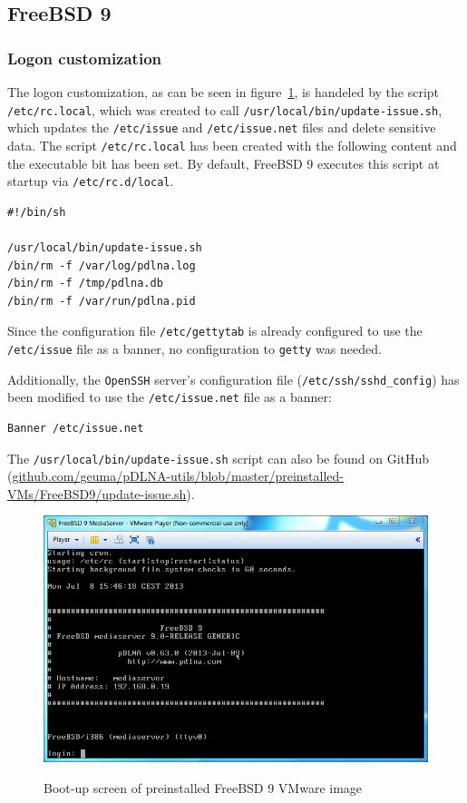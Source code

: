 \documentclass[a4paper,oneside,10pt]{report}
\newenvironment{colframefile}{%
  \begin{Sbox}
    \begin{minipage}{.99\columnwidth}
}{%
  \end{minipage}
  \end{Sbox}
  \begin{center}
    \fcolorbox{black}{Yellow}{\TheSbox}
  \end{center}
}
\begin{document}
\subsection{FreeBSD 9}

\subsubsection{Logon customization}

The logon customization, as can be seen in figure~\ref{fig:freebsd9-loginscreen}, is handeled by the script \verb|/etc/rc.local|, which was created to call \verb|/usr/local/bin/update-issue.sh|, which updates the \verb|/etc/issue| and \verb|/etc/issue.net| files and delete sensitive data. The script \verb|/etc/rc.local| has been created with the following content and the executable bit has been set. By default, FreeBSD 9 executes this script at startup via \verb|/etc/rc.d/local|.
\begin{colframefile}
\begin{verbatim}
#!/bin/sh

/usr/local/bin/update-issue.sh
/bin/rm -f /var/log/pdlna.log
/bin/rm -f /tmp/pdlna.db
/bin/rm -f /var/run/pdlna.pid
\end{verbatim}
\end{colframefile}

Since the configuration file \verb|/etc/gettytab| is already configured to use the \verb|/etc/issue| file as a banner, no configuration to \verb|getty| was needed.

Additionally, the \verb|OpenSSH| server's configuration file (\verb|/etc/ssh/sshd_config|) has been modified to use the \verb|/etc/issue.net| file as a banner:
\begin{colframefile}
\begin{verbatim}
Banner /etc/issue.net
\end{verbatim}
\end{colframefile}

The \verb|/usr/local/bin/update-issue.sh| script can also be found on GitHub (\url{github.com/geuma/pDLNA-utils/blob/master/preinstalled-VMs/FreeBSD9/update-issue.sh}).

\begin{figure}
	\centering
		\includegraphics[width=34em]{images/vm_freebsd9_loginscreen}
	\label{fig:freebsd9-loginscreen}
	\caption{Boot-up screen of preinstalled FreeBSD 9 VMware image}
\end{figure}
\end{document}
